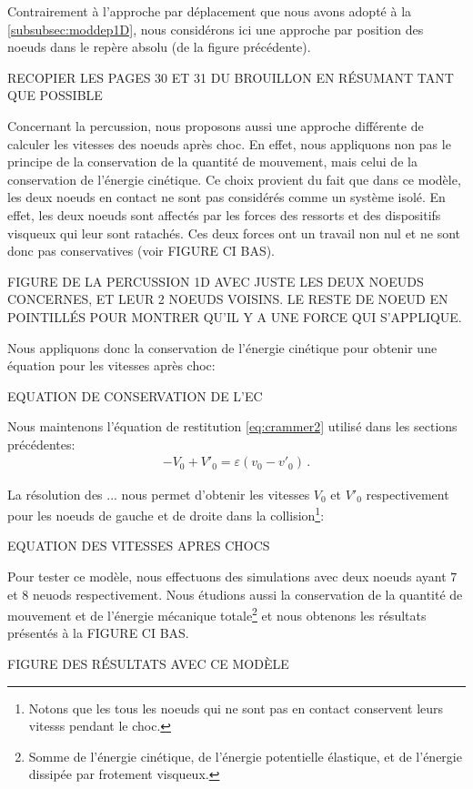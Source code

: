 Contrairement à l'approche par déplacement que nous avons adopté à la \cref{subsubsec:moddep1D}, nous considérons ici une approche par position des noeuds dans le repère absolu (de la figure précédente).  

RECOPIER LES PAGES 30 ET 31 DU BROUILLON EN RÉSUMANT TANT QUE POSSIBLE

Concernant la percussion, nous proposons aussi une approche différente de calculer les vitesses des noeuds après choc. En effet, nous appliquons non pas le principe de la conservation de la quantité de mouvement, mais celui de la conservation de l'énergie cinétique. Ce choix provient du fait que dans ce modèle, les deux noeuds en contact ne sont pas considérés comme un système isolé. En effet, les deux noeuds sont affectés par les forces des ressorts et des dispositifs visqueux qui leur sont ratachés. Ces deux forces ont un travail non nul et ne sont donc pas conservatives (voir FIGURE CI BAS). 

FIGURE DE LA PERCUSSION 1D AVEC JUSTE LES DEUX NOEUDS CONCERNES, ET LEUR 2 NOEUDS VOISINS. LE RESTE DE NOEUD EN POINTILLÉS POUR MONTRER QU'IL Y A UNE FORCE QUI S'APPLIQUE. 

Nous appliquons donc la conservation de l'énergie cinétique pour obtenir une équation pour les vitesses après choc:

EQUATION DE CONSERVATION DE L'EC

Nous maintenons l'équation de restitution \cref{eq:crammer2} utilisé dans les sections précédentes:
\begin{align}
    - V_0 + V'_0 = \varepsilon (v_0 - v'_0) \,.
\end{align}

La résolution des ... nous permet d'obtenir les vitesses $V_0$ et $V'_0$ respectivement pour les noeuds de gauche et de droite dans la collision\footnote{Notons que les tous les noeuds qui ne sont pas en contact conservent leurs vitesss pendant le choc.}:

EQUATION DES VITESSES APRES CHOCS

Pour tester ce modèle, nous effectuons des simulations avec deux noeuds ayant $7$ et $8$ neuods respectivement. Nous étudions aussi la conservation de la quantité de mouvement et de l'énergie mécanique totale\footnote{Somme de l'énergie cinétique, de l'énergie potentielle élastique, et de l'énergie dissipée par frotement visqueux.} et nous obtenons les résultats présentés à la FIGURE CI BAS.

FIGURE DES RÉSULTATS AVEC CE MODÈLE


